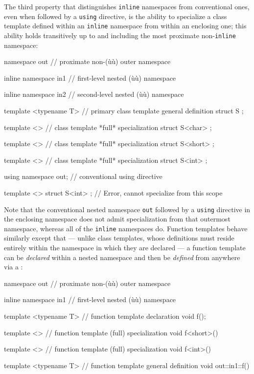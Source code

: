 The third property that distinguishes \lstinline!inline! namespaces from
conventional ones, even when followed by a \lstinline!using! directive, is
the ability to specialize a class template defined within an
\lstinline!inline! namespace from within an enclosing one; this ability
holds transitively up to and including the most proximate
non-\lstinline!inline! namespace:

\begin{emcppslisting}[emcppserrorlines={24}]
namespace out                      // proximate non-(ù{}ù) outer namespace
{
    inline namespace in1           // first-level nested (ù{}ù) namespace
    {
        inline namespace in2       // second-level nested (ù{}ù) namespace
        {
            template <typename T>  // primary class template general definition
            struct S { };

            template <>            // class template *full* specialization
            struct S<char> { };
        }

        template <>                // class template *full* specialization
        struct S<short> { };
    }

    template <>                    // class template *full* specialization
    struct S<int> { };
}

using namespace out;               // conventional using directive

template <>
struct S<int> { };                 // Error, cannot specialize from this scope
\end{emcppslisting}
    
\noindent Note that the conventional nested namespace \lstinline!out! followed by a
\lstinline!using! directive in the enclosing namespace does not admit
specialization from that outermost namespace, whereas all of the
\lstinline!inline! namespaces do. Function templates behave similarly
except that --- unlike class templates, whose definitions must reside
entirely within the namespace in which they are declared --- a function
template can be \emph{declared} within a nested namespace and then be
\emph{defined} from anywhere via a :

\begin{emcppslisting}
namespace out                      // proximate non-(ù{}ù) outer namespace
{
    inline namespace in1           // first-level nested (ù{}ù) namespace
    {
        template <typename T>      // function template declaration
        void f();

        template <>                // function template (full) specialization
        void f<short>() { }
    }

    template <>                    // function template (full) specialization
    void f<int>() { }
}

template <typename T>              // function template general definition
void out::in1::f() { }
\end{emcppslisting}
    
